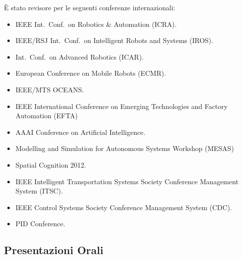 \documentclass[11pt]{article}
\begin{document}
\begin{itemize}
\noindent \`E stato revisore per le seguenti conferenze internazionali:
\begin{itemize}
\item IEEE Int.~Conf.~on Robotics \& Automation (ICRA).
\item IEEE/RSJ Int.~Conf.~on Intelligent Robots and Systems (IROS).
\item Int.~Conf.~on Advanced Robotics (ICAR).
\item European Conference on Mobile Robots (ECMR). 
\item IEEE/MTS OCEANS. 
\item IEEE International Conference on Emerging Technologies and Factory Automation (EFTA)
\item AAAI Conference on Artificial Intelligence. 
\item Modelling and Simulation for Autonomous Systems Workshop (MESAS)
\item Spatial Cognition 2012.
\item IEEE Intelligent Transportation Systems Society Conference Management System (ITSC).
\item IEEE Control Systems Society Conference Management System (CDC).
\item PID Conference.
\end{itemize}

\subsection*{Presentazioni Orali}


\end{itemize}
\end{document}
